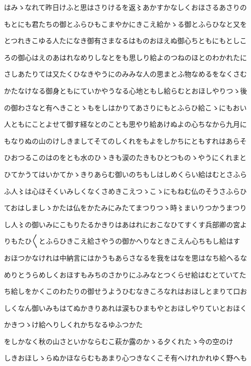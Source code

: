 \documentclass[a4paper,11pt,landscape]{ltjtarticle}
\begin{document}
はみゝなれて昨日けふと思はさりけるを返〻あかすかなしくおほさるあさりの
\par\medskip
もとにも君たちの御とふらひもこまやかにきこえ給かゝる御とふらひなと又を
\par\medskip
とつれきこゆる人たになき御有さまなるはものおほえぬ御心ちともにもとしこ
\par\medskip
ろの御心はえのあはれなめりしなとをも思しり給よのつねのほとのわかれたに
\par\medskip
さしあたりては又たくひなきやうにのみみな人の思まとふ物なめるをなくさむ
\par\medskip
かたなけなる御身ともにていかやうなる心地ともし給らむとおほしやりつゝ後
\par\medskip
の御わさなと有へきことゝもをしはかりてあさりにもとふらひ給こゝにもおい
\par\medskip
人ともにことよせて御す経なとのことも思やり給あけぬよの心ちなから九月に
\par\medskip
もなりぬの山のけしきましてそてのしくれをもよをしかちにともすれはあらそ
\par\medskip
ひおつるこのはのをとも水のひゝきも涙のたきもひとつものゝやうにくれまと
\par\medskip
ひてかうてはいかてかゝきりあらむ御いのちもしはしめくらい給はむとさふら
\par\medskip
ふ人〻は心ほそくいみしくなくさめきこえつゝこゝにもねむ仏のそうさふらひ
\par\medskip
ておはしましゝかたは仏をかたみにみたてまつりつゝ時〻まいりつかうまつり
\par\medskip
し人〻の御いみにこもりたるかきりはあはれにおこなひてすくす兵部卿の宮よ
\par\medskip
りもたひ〱とふらひきこえ給さやうの御かへりなときこえん心ちもし給はす
\par\medskip
おほつかなけれは中納言にはかうもあらさなるを我をはなを思はなち給へるな
\par\medskip
めりとうらめしくおほすもみちのさかりにふみなとつくらせ給はむとていてた
\par\medskip
ち給しをかくこのわたりの御せうようひむなきころなれはおほしとまりて口お
\par\medskip
しくなん御いみもはてぬかきりあれは涙もひまもやとおほしやりていとおほく
\par\medskip
かきつゝけ給へりしくれかちなるゆふつかた
\par\medskip
をしかなく秋の山さといかならむこ萩か露のかゝる夕くれたゝ今の空のけ
\par\medskip
しきおほしゝらぬかほならむもあまり心つきなくこそ有へけれかれゆく野へも
\end{document}
